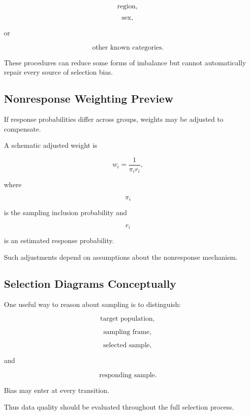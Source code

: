\[
\text{region},
\]

\[
\text{sex},
\]

or

\[
\text{other known categories}.
\]

These procedures can reduce some forms of imbalance but cannot
automatically repair every source of selection bias.

\subsection{Nonresponse Weighting Preview}
\label{subsec:nonresponse-weighting-preview}

If response probabilities differ across groups, weights may be adjusted
to compensate.

A schematic adjusted weight is

\[
\boxed{
w_i
=
\frac{
1
}{
\pi_i r_i
},
}
\]

where

\[
\pi_i
\]

is the sampling inclusion probability and

\[
r_i
\]

is an estimated response probability.

Such adjustments depend on assumptions about the nonresponse mechanism.

\subsection{Selection Diagrams Conceptually}
\label{subsec:selection-diagrams-conceptually}

One useful way to reason about sampling is to distinguish:

\[
\boxed{
\text{target population},
}
\]

\[
\boxed{
\text{sampling frame},
}
\]

\[
\boxed{
\text{selected sample},
}
\]

and

\[
\boxed{
\text{responding sample}.
}
\]

Bias may enter at every transition.

Thus data quality should be evaluated throughout the full selection
process.

